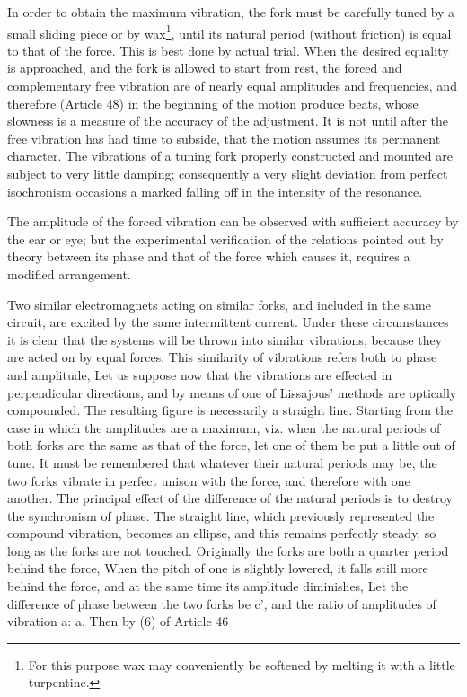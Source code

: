 In order to obtain the maximum vibration, the fork must be carefully tuned by a
small sliding piece or by wax\footnote{For this purpose wax may conveniently
be softened by melting it with a little turpentine.}, until its natural period
(without friction) is equal to that of the force. This is best done by actual
trial. When the desired equality is approached, and the fork is allowed to
start from rest, the forced and complementary free vibration are of nearly
equal amplitudes and frequencies, and therefore (Article 48) in the beginning
of the motion produce beats, whose slowness is a measure of the accuracy of the
adjustment. It is not until after the free vibration has had time to subside,
that the motion assumes its permanent character. The vibrations of a tuning
fork properly constructed and mounted are subject to very little damping;
consequently a very slight deviation from perfect isochronism occasions a
marked falling off in the intensity of the resonance.

The amplitude of the forced vibration can be observed with sufficient accuracy
by the ear or eye; but the experimental verification of the relations pointed
out by theory between its phase and that of the force which causes it, requires
a modified arrangement.

Two similar electromagnets acting on similar forks, and included in the same
circuit, are excited by the same intermittent current. Under these
circumstances it is clear that the systems will be thrown into similar
vibrations, because they are acted on by equal forces. This similarity of
vibrations refers both to phase and amplitude, Let us suppose now that the
vibrations are effected in perpendicular directions, and by means of one of
Lissajous' methods are optically compounded. The resulting figure is
necessarily a straight line. Starting from the case in which the amplitudes are
a maximum, viz. when the natural periods of both forks are the same as that of
the force, let one of them be put a little out of tune. It must be remembered
that whatever their natural periods may be, the two forks vibrate in perfect
unison with the force, and therefore with one another. The principal effect of
the difference of the natural periods is to destroy the synchronism of phase.
The straight line, which previously represented the compound vibration, becomes
an ellipse, and this remains perfectly steady, so long as the forks are not
touched. Originally the forks are both a quarter period behind the force, When
the pitch of one is slightly lowered, it falls still more behind the force, and
at the same time its amplitude diminishes, Let the difference of phase between
the two forks be c', and the ratio of amplitudes of vibration a: a. Then by (6)
of Article 46

